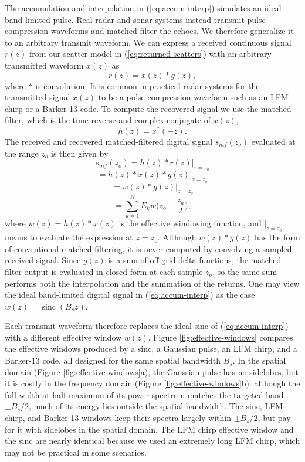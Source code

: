 \documentclass[sensors,article,submit,moreauthors]{Definitions/mdpi}
\DeclareMathOperator{\sinc}{sinc}
\begin{document}
The accumulation and interpolation in (\ref{eq:accum-interp}) simulates an ideal band-limited pulse. Real radar and sonar systems instead transmit pulse-compression waveforms and matched-filter the echoes. We therefore generalize it to an arbitrary transmit waveform. We can express a received continuous signal $r(z)$ from our scatter model in (\ref{eq:returned-scatters}) with an arbitrary transmitted waveform $x(z)$ as
\begin{equation}
    r(z) = x(z) * g(z)
    ,
\end{equation}
where $*$ is convolution. It is common in practical radar systems for the transmitted signal $x(z)$ to be a pulse-compression waveform such as an LFM chirp or a Barker-13 code. To compute the recovered signal we use the matched filter, which is the time reverse and complex conjugate of
$x(z)$,
\begin{equation}
    h(z) = x^*(-z)
    .
\end{equation}
The received and recovered matched-filtered digital signal $s_{mf}(z_o)$ evaluated at the range $z_o $ is then given by 
\begin{equation}
    s_{mf}(z_o) = h(z)*r(z) |_{z=z_o}
\end{equation}
\begin{equation}
    = h(z)*x(z)*g(z) |_{z=z_o}
     \end{equation}
\begin{equation}
    =w(z)*g(z) |_{z=z_o}
\end{equation}
\begin{equation}
    =\sum_{k=1}^{N}E_kw\bigg(z_o-\frac{z_k}{2}\bigg)
    ,
\end{equation}
where $w(z) = h(z) * x(z)$ is the effective windowing function, and $|_{z=z_o}$ means to evaluate the expression at $z=z_o$. Although $w(z)*g(z)$ has the form of conventional matched filtering, it is never computed by convolving a sampled received signal. Since $g(z)$ is a sum of off-grid delta functions, the matched-filter output is evaluated in closed form at each sample $z_o$, so the same sum performs both the interpolation and the summation of the returns. One may view the ideal band-limited digital signal in (\ref{eq:accum-interp}) as the case $w(z)=\sinc(B_s z)$.

Each transmit waveform therefore replaces the ideal sinc of (\ref{eq:accum-interp}) with a different effective window $w(z)$. Figure \ref{fig:effective-windows} compares the effective windows produced by a sinc, a Gaussian pulse, an LFM chirp, and a Barker-13 code, all designed for the same spatial bandwidth $B_s$. In the spatial domain (Figure \ref{fig:effective-windows}a), the Gaussian pulse has no sidelobes, but it is costly in the frequency domain (Figure \ref{fig:effective-windows}b): although the full width at half maximum of its power spectrum matches the targeted band $\pm B_s/2$, much of its energy lies outside the spatial bandwidth. The sinc, LFM chirp, and Barker-13 windows keep their spectra largely within $\pm B_s/2$, but pay for it with sidelobes in the spatial domain. The LFM chirp effective window and the sinc are nearly identical because we used an extremely long LFM chirp, which may not be practical in some scenarios.
\end{document}
